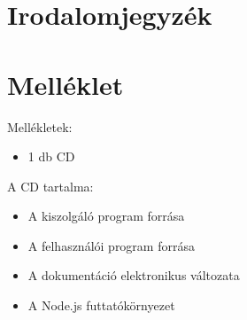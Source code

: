 \documentclass[bibliography=totocnumbered]{article}
\begin{document}
\section{Irodalomjegyzék}

\nocite{*}

\let\oldsection\section
\let\Section\section 
\def\section*#1{\Section{#1}} 


\renewcommand{\section}[1]{\oldsection{#1}}

\section{Melléklet}

Mellékletek:

\begin{itemize}
\item
  1 db CD
\end{itemize}

A CD tartalma:

\begin{itemize}
\item
  A kiszolgáló program forrása
\item
  A felhasználói program forrása
\item
  A dokumentáció elektronikus változata
\item
  A Node.js futtatókörnyezet
\end{itemize}
\end{document}
